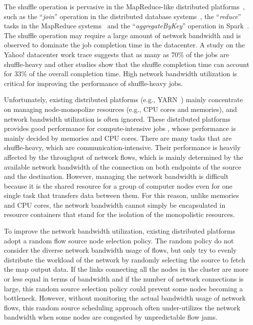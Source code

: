 \documentclass[10pt,journal,compsoc]{IEEEtran}
\begin{document}



 

The shuffle operation is pervasive in the MapReduce-like distributed platforms~\cite{dean2008mapreduce,hindman2011mesos}, 
such as the ``\emph{join}'' operation in the distributed database systems~\cite{thusoo2009hive, Yu:2008:DSG,Armbrust:2015:SSR}, 
the ``\emph{reduce}'' tasks in the MapReduce systems~\cite{dean2008mapreduce,vavilapalli2013apache}
and the ``\emph{aggregateByKey}'' operation in Spark~\cite{zaharia2012resilient}.
The shuffle operation may require a large amount of network bandwidth 
and is observed to dominate the job completion time in the datacenter.
A study on the Yahoo! datacenter work trace suggests that as many as 70\% of 
the jobs are shuffle-heavy and other studies show that the shuffle completion time
can account for 33\% of the overall completion time.
High network bandwidth utilization is critical for improving the performance of 
shuffle-heavy jobs.

Unfortunately, existing distributed platforms (e.g., YARN~\cite{vavilapalli2013apache}) mainly concentrate on
managing node-monopolize resources (e.g., CPU cores and memories),
and network bandwidth utilization is often ignored.  
These distributed platforms provides good performance for compute-intensive jobs , whose performance is mainly decided by
memories and CPU cores.
There are many tasks that are shuffle-heavy, which are communication-intensive.
Their performance is heavily 
affected by the throughput of network flows, which is
mainly determined by the available network bandwidth of
the connection on both endpoints of the source and the destination. 
However, managing the network bandwidth is difficult because it is the shared resource for a group of computer nodes even for one single task that transfers data between them. 
For this reason, unlike memories and CPU cores, the network bandwidth cannot simply be encapsulated in resource containers that stand for the isolation of the monopolistic resources.

To improve the network bandwidth utilization, existing distributed platforms~\cite{zaharia2012resilient,vavilapalli2013apache} adopt a random flow source node selection policy. 
The random policy do not consider the diverse network bandwidth usage of flows, but
only try to evenly distribute the workload of the network
by randomly selecting the source to fetch the map output data.
If the links connecting all the nodes in the cluster
are more or less equal in terms of bandwidth
and if the number of network connections is
large, this random source selection policy could prevent some nodes becoming a bottleneck.
However, 
without monitoring the actual bandwidth usage of network flows,
this random source scheduling approach often under-utilizes the network bandwidth when some nodes are congested by unpredictable flow jams. 
\end{document}
